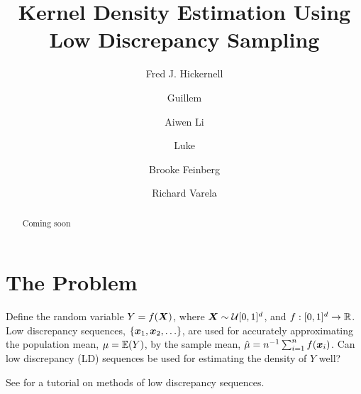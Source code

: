 \documentclass[letterpaper]{amsart}
\begin{document}
\title{Kernel Density Estimation Using Low Discrepancy Sampling}
\author{Fred J. Hickernell}
\author{Guillem}
\author{Aiwen Li}
\author{Luke}
\author{Brooke Feinberg}
\author{Richard Varela}
\begin{abstract} Coming soon
\end{abstract}

\maketitle

\section{The Problem} \label{sec:problem}

Define the random variable $Y = f(\boldsymbol{X})$, where $\boldsymbol{X} \sim \mathcal{U}[0,1]^d$, and $f:[0,1]^d \to \mathbb{R}$.  Low discrepancy sequences, $\{\boldsymbol{x}_1, \boldsymbol{x}_2, \ldots \}$, are used for accurately approximating  the population mean, $\mu = \operatorname{\mathbb{E}}(Y)$, by the sample mean, $\hat{\mu} = n^{-1} \sum_{i=1}^n f(\boldsymbol{x}_i)$.   Can low discrepancy (LD) sequences be used for estimating the density of $Y$ well?

See \cite{DicEtal14a} for a tutorial on methods of low discrepancy sequences.
\end{document}
